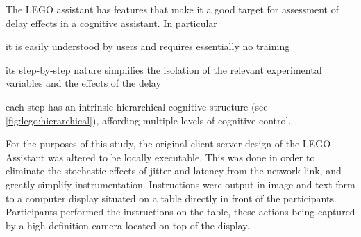 The LEGO assistant has features that make it a good target for assessment of delay effects in a cognitive assistant.
In particular
\begin{enumerate*}[itemjoin={{, }},
                  itemjoin*={{, and }},
                  label={{(\arabic*)}}]
    \item it is easily understood by users and requires essentially no training
    \item its step-by-step nature simplifies the isolation of the relevant experimental variables and the effects of the delay
    \item each step has an intrinsic hierarchical cognitive structure (see \cref{fig:lego:hierarchical}), affording multiple levels of cognitive control. 
\end{enumerate*}

\begin{figure*}[h]
  \centering
  \caption{Hierarchical cognitive structure of a step in the LEGO task.}
  \label{fig:lego:hierarchical}
\end{figure*}


For the purposes of this study, the original client-server design of the LEGO Assistant was altered to be locally executable.
This was done in order to eliminate the stochastic effects of jitter and latency from the network link, and greatly simplify instrumentation.
Instructions were output in image and text form to a computer display situated on a table directly in front of the participants.
Participants performed the instructions on the table, these actions being captured by a high-definition camera located on top of the display.


